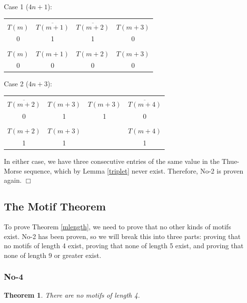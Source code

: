 \documentclass{article}
\newtheorem{theorem}{Theorem}[section]
\begin{document}
Case 1 ($4n+1$):

\begin{center}
\begin{tabular}{ |c|c|c|c| } 
 \hline
 &&&\\
$T(m)$ & $\overline{T(m+1)}$ & $\overline{T(m+2)}$ & $T(m+3)$ \\ 
0 & 1 & 1 & 0 \\
\hline
&&&\\
$T(m)$ & $T(m+1)$ & $T(m+2)$ & $T(m+3)$ \\
0 & 0 & 0 & 0 \\
 \hline
\end{tabular}
\end{center}

Case 2 ($4n+3$):

\begin{center}
\begin{tabular}{ |c|c|c|c| } 
 \hline
 &&&\\
$\overline{T(m+2)}$ & $T(m+3)$ & $T(m+3)$ & $\overline{T(m+4)}$ \\ 
0 & 1 & 1 & 0 \\
\hline
&&&\\
$T(m+2)$ & $T(m+3)$ & & $T(m+4)$ \\
1 & 1 &  & 1 \\
 \hline
\end{tabular}
\end{center}

In either case, we have three consecutive entries of the same value in the Thue-Morse sequence, which by Lemma \ref{triplet} never exist. Therefore, No-2 is proven again. $\Box$

\subsection{The Motif Theorem}

To prove Theorem \ref{mlength}, we need to prove that no other kinds of motifs exist. No-2 has been proven, so we will break this into three parts: proving that no motifs of length 4 exist, proving that none of length 5 exist, and proving that none of length 9 or greater exist.

\subsubsection{No-4}

\begin{theorem}
There are no motifs of length 4.
\end{theorem}
\end{document}
